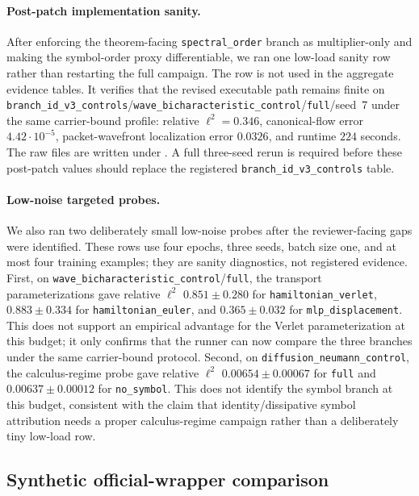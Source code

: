 \paragraph{Post-patch implementation sanity.}
After enforcing the theorem-facing \texttt{spectral\_order} branch as multiplier-only and making the symbol-order proxy differentiable, we ran one low-load sanity row rather than restarting the full campaign.  The row is not used in the aggregate evidence tables.  It verifies that the revised executable path remains finite on \texttt{branch\_id\_v3\_controls}/\texttt{wave\_bicharacteristic\_control}/\texttt{full}/seed~7 under the same carrier-bound profile: relative $\ell^2=0.346$, canonical-flow error $4.42\cdot10^{-5}$, packet-wavefront localization error $0.0326$, and runtime $224$ seconds.  The raw files are written under .  A full three-seed rerun is required before these post-patch values should replace the registered \texttt{branch\_id\_v3\_controls} table.

\paragraph{Low-noise targeted probes.}
We also ran two deliberately small low-noise probes after the reviewer-facing gaps were identified.  These rows use four epochs, three seeds, batch size one, and at most four training examples; they are sanity diagnostics, not registered evidence.  First, on \texttt{wave\_bicharacteristic\_control}/\texttt{full}, the transport parameterizations gave relative $\ell^2$ $0.851\pm0.280$ for \texttt{hamiltonian\_verlet}, $0.883\pm0.334$ for \texttt{hamiltonian\_euler}, and $0.365\pm0.032$ for \texttt{mlp\_displacement}.  This does not support an empirical advantage for the Verlet parameterization at this budget; it only confirms that the runner can now compare the three branches under the same carrier-bound protocol.  Second, on \texttt{diffusion\_neumann\_control}, the calculus-regime probe gave relative $\ell^2$ $0.00654\pm0.00067$ for \texttt{full} and $0.00637\pm0.00012$ for \texttt{no\_symbol}.  This does not identify the symbol branch at this budget, consistent with the claim that identity/dissipative symbol attribution needs a proper calculus-regime campaign rather than a deliberately tiny low-load row.

\subsection{Synthetic official-wrapper comparison}

